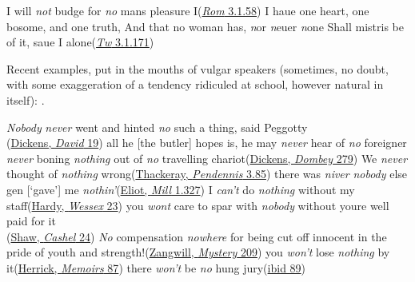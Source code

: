 \ea \label{ex:07-11}
\ea I will \emph{not} budge for \emph{no} mans pleasure I\hfill(\href{https://internetshakespeare.uvic.ca/doc/Rom_F1/scene/3.1/index.html#tln-1485}{\textit{Rom} 3.1.58})
\ex I haue one heart, one bosome, and one truth, And that no woman has, \emph{n}or \emph{n}euer \emph{n}one Shall mistris be of it, saue I alone\hfill(\href{https://internetshakespeare.uvic.ca/doc/TN_F1/scene/3.1/index.html#tln-1370}{\textit{Tw} 3.1.171}) %
\z
\z

Recent examples, put in the mouths of vulgar speakers (sometimes, no doubt, with some exaggeration of a tendency ridiculed at school, however natural in itself): .

\ea \label{ex:07-12}
\ea \emph{Nobody} \emph{never} went and hinted \emph{no} such a thing, said Peggotty\\\hfill(\href{https://archive.org/details/personalhistory05dickgoog/page/n15/mode/2up?q=%22went+and+hinted%22&view=theater}{Dickens, \textit{David} 19})
\ex all he [the butler] hopes is, he may \emph{never} hear of \emph{no} foreigner \emph{never} boning \emph{nothing} out of \emph{no} travelling chariot\hfill(\href{https://archive.org/details/dombeyson00dick_0/page/440/mode/2up?q=%22All+he+hopes+is%22&view=theater}{Dickens, \textit{Dombey} 279})
\ex We \emph{never} thought of \emph{nothing} wrong\hfill(\href{https://archive.org/details/dli.ministry.14127/page/493/mode/2up?q=%22never+thought%22&view=theater}{Thackeray, \textit{Pendennis} 3.85})
\ex there was \emph{niver} \emph{nobody} else gen [`gave'] me \emph{nothin'}\hfill(\href{https://archive.org/details/millonfloss0009geor/page/254/mode/2up?q=%22niver+nobody%27%22&view=theater}{Eliot, \textit{Mill} 1.327})
\ex I \emph{can't} do \emph{nothing} without my staff\hfill(\href{https://archive.org/details/dli.bengal.10689.8131/page/n31/mode/2up?q=%22nothing+without+my+staff%22&view=theater}{Hardy, \textit{Wessex} 23})
\ex you \emph{wont} care to spar with \emph{nobody} without youre well paid for it\\\hfill(\href{https://archive.org/details/cashelbyronsprof00shawuoft/page/n51/mode/2up?q=%22you+wont+care+to%22&view=theater}{Shaw, \textit{Cashel} 24}) %
\ex \emph{No} compensation \emph{nowhere} for being cut off innocent in the pride of youth and strength!\hfill(\href{https://archive.org/details/greywigstoriesno00zang/page/290/mode/2up?q=%22compensation+nowhere%22&view=theater}{Zangwill, \textit{Mystery} 209}) %
\ex you \emph{won't} lose \emph{nothing} by it\hfill(\href{https://archive.org/details/memoirsofamerica0000robe/page/86/mode/2up?view=theater&q=%22nothing+by+it%22}{Herrick, \textit{Memoirs} 87})
\ex there \emph{won't} be \emph{no} hung jury\hfill(\href{https://archive.org/details/memoirsofamerica0000robe/page/88/mode/2up?view=theater&q=%22no+hung+jury%22}{ibid 89})
\z
\z

